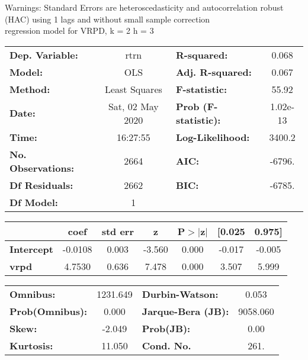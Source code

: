 Warnings: \newline
 [1] Standard Errors are heteroscedasticity and autocorrelation robust (HAC) using 1 lags and without small sample correction\\ 

regression model for VRPD, k = 2 h = 3\begin{center}
\begin{tabular}{lclc}
\toprule
\textbf{Dep. Variable:}    &       rtrn       & \textbf{  R-squared:         } &     0.068   \\
\textbf{Model:}            &       OLS        & \textbf{  Adj. R-squared:    } &     0.067   \\
\textbf{Method:}           &  Least Squares   & \textbf{  F-statistic:       } &     55.92   \\
\textbf{Date:}             & Sat, 02 May 2020 & \textbf{  Prob (F-statistic):} &  1.02e-13   \\
\textbf{Time:}             &     16:27:55     & \textbf{  Log-Likelihood:    } &    3400.2   \\
\textbf{No. Observations:} &        2664      & \textbf{  AIC:               } &    -6796.   \\
\textbf{Df Residuals:}     &        2662      & \textbf{  BIC:               } &    -6785.   \\
\textbf{Df Model:}         &           1      & \textbf{                     } &             \\
\bottomrule
\end{tabular}
\begin{tabular}{lcccccc}
                   & \textbf{coef} & \textbf{std err} & \textbf{z} & \textbf{P$> |$z$|$} & \textbf{[0.025} & \textbf{0.975]}  \\
\midrule
\textbf{Intercept} &      -0.0108  &        0.003     &    -3.560  &         0.000        &       -0.017    &       -0.005     \\
\textbf{vrpd}      &       4.7530  &        0.636     &     7.478  &         0.000        &        3.507    &        5.999     \\
\bottomrule
\end{tabular}
\begin{tabular}{lclc}
\textbf{Omnibus:}       & 1231.649 & \textbf{  Durbin-Watson:     } &    0.053  \\
\textbf{Prob(Omnibus):} &   0.000  & \textbf{  Jarque-Bera (JB):  } & 9058.060  \\
\textbf{Skew:}          &  -2.049  & \textbf{  Prob(JB):          } &     0.00  \\
\textbf{Kurtosis:}      &  11.050  & \textbf{  Cond. No.          } &     261.  \\
\bottomrule
\end{tabular}
\end{center}

